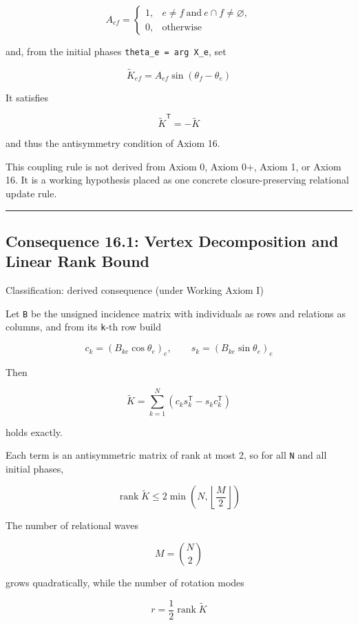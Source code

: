 \documentclass[
  a4paper,
]{article}
\begin{document}
\[
A_{ef}
=
\begin{cases}
1,& e\ne f\ \text{and}\ e\cap f\ne\varnothing,\\
0,& \text{otherwise}
\end{cases}
\]

and, from the initial phases \texttt{theta\_e\ =\ arg\ X\_e}, set

\[
\widetilde K_{ef}
=
A_{ef}\sin(\theta_f-\theta_e)
\]

It satisfies

\[
\widetilde K^{\mathsf T}=-\widetilde K
\]

and thus the antisymmetry condition of Axiom 16.

This coupling rule is not derived from Axiom 0, Axiom 0+, Axiom 1, or
Axiom 16. It is a working hypothesis placed as one concrete
closure-preserving relational update rule.

\begin{center}\rule{0.5\linewidth}{0.5pt}\end{center}

\subsection{Consequence 16.1: Vertex Decomposition and Linear Rank
Bound}\label{consequence-16.1-vertex-decomposition-and-linear-rank-bound}

Classification: derived consequence (under Working Axiom I)

Let \texttt{B} be the unsigned incidence matrix with individuals as rows
and relations as columns, and from its \texttt{k}-th row build

\[
c_k=(B_{ke}\cos\theta_e)_{e},
\qquad
s_k=(B_{ke}\sin\theta_e)_{e}
\]

Then

\[
\widetilde K=\sum_{k=1}^{N}\left(c_k s_k^{\mathsf T}-s_k c_k^{\mathsf T}\right)
\]

holds exactly.

Each term is an antisymmetric matrix of rank at most 2, so for all
\texttt{N} and all initial phases,

\[
\operatorname{rank}\widetilde K
\le
2\min\!\left(N,\left\lfloor\frac{M}{2}\right\rfloor\right)
\]

The number of relational waves

\[
M=\binom{N}{2}
\]

grows quadratically, while the number of rotation modes

\[
r=\frac12\operatorname{rank}\widetilde K
\]
\end{document}
